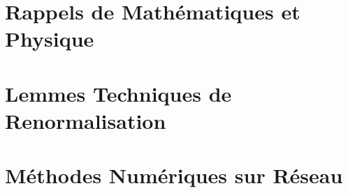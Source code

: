 \documentclass[12pt,a4paper]{book}
\theoremstyle{remark}
\theoremstyle{definition}
\theoremstyle{plain}
\begin{document}
	\appendix
	
	\chapter{Rappels de Mathématiques et Physique}
	\label{ann:A}
	
	
	\chapter{Lemmes Techniques de Renormalisation}
	\label{ann:B}
	
	
	\chapter{Méthodes Numériques sur Réseau}
	\label{ann:C}
	
	
	\begin{thebibliography}{99}
	\end{thebibliography}
	
\end{document}
